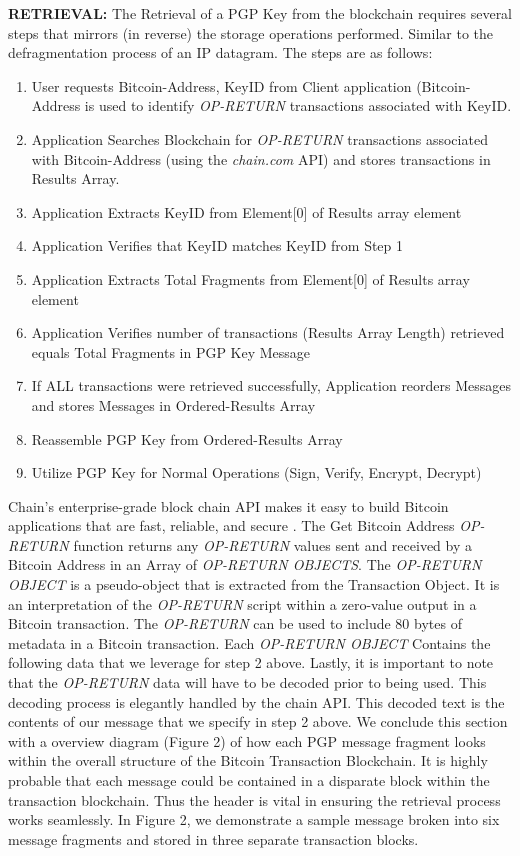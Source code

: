 \documentclass{llncs}
\begin{document}
\textbf{RETRIEVAL: } The Retrieval of a PGP Key from the blockchain requires several steps that mirrors (in reverse) the storage operations performed.  Similar to the defragmentation process of an IP datagram.  The steps are as follows: 

\begin{enumerate} 
\item User requests {Bitcoin-Address, KeyID} from Client application (Bitcoin-Address is used to identify \textit{OP-RETURN} transactions associated with KeyID.
\item Application Searches Blockchain for \textit{OP-RETURN} transactions associated with Bitcoin-Address (using the \textit{chain.com} API) and stores transactions in Results Array.
\item Application Extracts KeyID from Element[0] of Results array element
\item Application Verifies that KeyID matches KeyID from Step 1
\item Application Extracts Total Fragments from Element[0] of Results array element
\item Application Verifies number of transactions (Results Array Length) retrieved equals Total Fragments in PGP Key Message
\item If ALL transactions were retrieved successfully, Application reorders Messages and stores Messages in Ordered-Results Array
\item Reassemble PGP Key from Ordered-Results Array
\item Utilize PGP Key for Normal Operations (Sign, Verify, Encrypt, Decrypt)
\end{enumerate}

Chain's enterprise-grade block chain API makes it easy to build Bitcoin applications that are fast, reliable, and secure \cite{chain}.  The Get Bitcoin Address \textit{OP-RETURN} function returns any \textit{OP-RETURN} values sent and received by a Bitcoin Address in an Array of \textit{OP-RETURN OBJECTS}.  The \textit{OP-RETURN OBJECT}  is a pseudo-object that is extracted from the Transaction Object. It is an interpretation of the \textit{OP-RETURN} script within a zero-value output in a Bitcoin transaction. The \textit{OP-RETURN} can be used to include 80 bytes of metadata in a Bitcoin transaction.  Each \textit{OP-RETURN OBJECT} Contains the following data that we leverage for step 2 above.  Lastly, it is important to note that the \textit{OP-RETURN} data will have to be decoded prior to being used.  This decoding process is elegantly handled by the chain API.  This decoded text is the contents of our message that we specify in step 2 above.  We conclude this section with a overview diagram (Figure 2) of how each PGP message fragment looks within the overall structure of the Bitcoin Transaction Blockchain.  It is highly probable that each message could be contained in a disparate block within the transaction blockchain.  Thus the header is vital in ensuring the retrieval process works seamlessly.  In Figure 2, we demonstrate a sample message broken into six message fragments and stored in three separate transaction blocks. 
\end{document}
